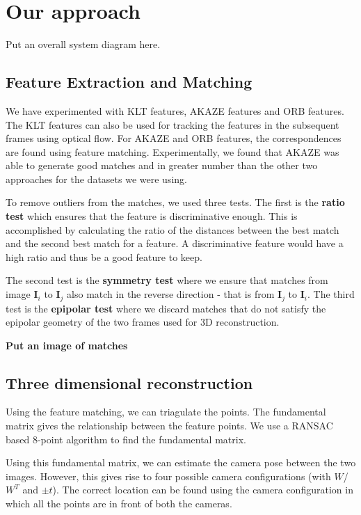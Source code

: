 \documentclass{article}
\begin{document}
\section{Our approach}
Put an overall system diagram here.

\subsection{Feature Extraction and Matching}
We have experimented with KLT features, AKAZE features and ORB features. The KLT features can also be used for tracking the features in the subsequent frames using optical flow. For AKAZE\cite{akaze} and ORB features, the correspondences are found using feature matching. Experimentally, we found that AKAZE was able to generate good matches and in greater number than the other two approaches for the datasets we were using.

To remove outliers from the matches, we used three tests. The first is the \textbf{ratio test} which ensures that the feature is discriminative enough. This is accomplished by calculating the ratio of the distances between the best match and the second best match for a feature. A discriminative feature would have a high ratio and thus be a good feature to keep.

The second test is the \textbf{symmetry test} where we ensure that matches from image $\textbf{I}_i$ to $\textbf{I}_j$ also match in the reverse direction - that is from $\textbf{I}_j$ to $\textbf{I}_i$. The third test is the \textbf{epipolar test} where we discard matches that do not satisfy the epipolar geometry of the two frames used for 3D reconstruction.

\textbf{Put an image of matches}

\subsection{Three dimensional reconstruction}
Using the feature matching, we can triagulate the points. The fundamental matrix gives the relationship between the feature points. We use a RANSAC based 8-point algorithm to find the fundamental matrix.

Using this fundamental matrix, we can estimate the camera pose between the two images. However, this gives rise to four possible camera configurations (with $W$/$W^T$ and $\pm t$). The correct location can be found using the camera configuration in which all the points are in front of both the cameras.
\end{document}
